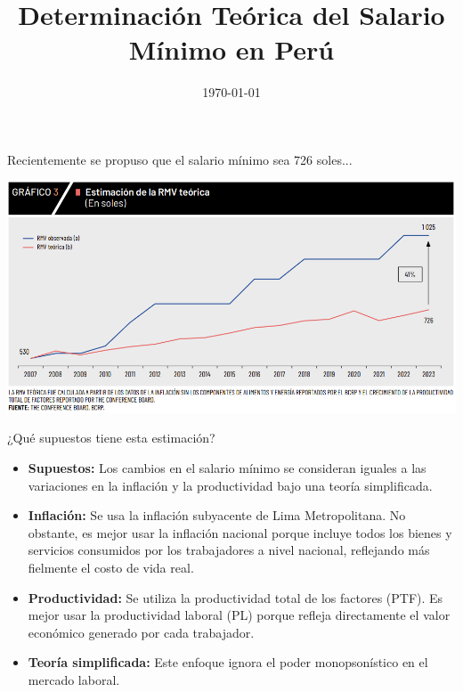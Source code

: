 \documentclass{beamer}
\title{Determinación Teórica del Salario Mínimo en Perú}
\author{}
\institute{}
\date{\today}
\begin{document}
\begin{frame}
    \titlepage
\end{frame}

\begin{frame}{Recientemente se propuso que el salario mínimo sea 726 soles...}
    \begin{center}
        \includegraphics[width=\linewidth]{bcrp_salmin.PNG}
    \end{center}
\end{frame}


\begin{frame}{¿Qué supuestos tiene esta estimación?}
    \begin{itemize}
        \item \textbf{Supuestos:} Los cambios en el salario mínimo se consideran iguales a las variaciones en la inflación y la productividad bajo una teoría simplificada.
        \item \textbf{Inflación:} Se usa la inflación subyacente de Lima Metropolitana. No obstante, es mejor usar la inflación nacional porque incluye todos los bienes y servicios consumidos por los trabajadores a nivel nacional, reflejando más fielmente el costo de vida real.
        \item \textbf{Productividad:} Se utiliza la productividad total de los factores (PTF). Es mejor usar la productividad laboral (PL) porque refleja directamente el valor económico generado por cada trabajador.
        \item \textbf{Teoría simplificada:} Este enfoque ignora el poder monopsonístico en el mercado laboral.
    \end{itemize}
\end{frame}
\end{document}
